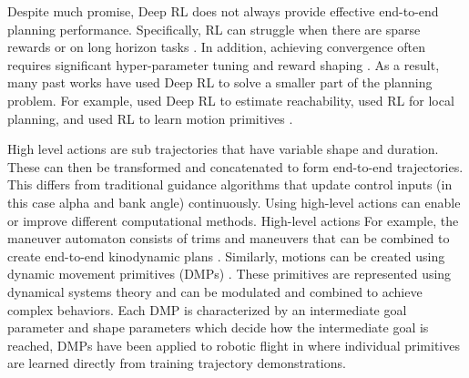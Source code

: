 \documentclass{UnderReview}
\begin{document}
Despite much promise, Deep RL does not always provide effective end-to-end planning performance.  Specifically, RL can struggle when there are sparse rewards \cite{faust2018prm} or on long horizon tasks \cite{Qureshi2021Motion}.  In addition, achieving convergence often requires significant hyper-parameter tuning and reward shaping \cite{berner2019dota}.   As a result, many past works have used Deep RL to solve a smaller part of the planning problem.  For example, \cite{chiang2019RL-RRT} used Deep RL to estimate reachability, \cite{faust2018prm} used RL for local planning, and \cite{goddard2021utilizing}  used RL to learn motion primitives .  
  
High level actions are sub trajectories that have variable shape and duration.  These can then be transformed and concatenated to form end-to-end trajectories.  This differs from traditional guidance algorithms that update control inputs (in this case alpha and bank angle) continuously.  Using high-level actions can enable or improve different computational methods.  High-level actions   For example, the maneuver automaton consists of trims and maneuvers that can be combined to create end-to-end kinodynamic plans \cite{frazzoli2000robust}.  Similarly, motions can be created using dynamic movement primitives (DMPs) \cite{ijspeert2002movement}.  These primitives are represented using dynamical systems theory and can be modulated and combined to achieve complex behaviors.  Each DMP is characterized by an intermediate goal parameter and shape parameters which decide how the intermediate goal is reached,  DMPs have been applied to robotic flight in \cite{perk2006motion} where individual primitives are learned directly from training trajectory demonstrations.   
\end{document}
